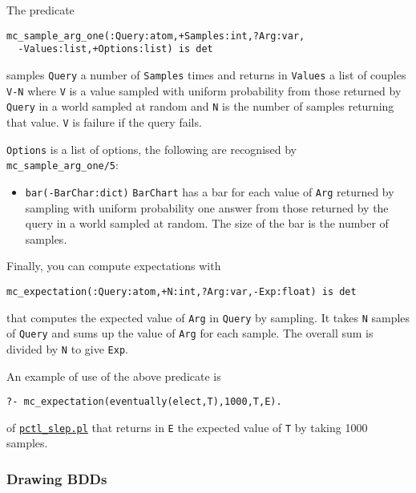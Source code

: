 The predicate
\begin{verbatim}
mc_sample_arg_one(:Query:atom,+Samples:int,?Arg:var,
  -Values:list,+Options:list) is det
\end{verbatim}
 samples \verb|Query| a number of \verb|Samples| times
and returns in \verb|Values| a list of couples \verb|V-N| where
\verb|V| is a value sampled with uniform probability from those returned
by \verb|Query| in a world sampled at random and \verb|N| is the number of samples
returning that value.
\verb|V| is failure if the query fails.

\verb|Options| is a list of options, the following are recognised by \verb|mc_sample_arg_one/5|:
\begin{itemize}
\item \verb|bar(-BarChar:dict)|
\verb|BarChart| has a bar for each value of \verb|Arg| returned by sampling with uniform
    probability one answer from those returned by the query in a world sampled
    at random.
    The size of the bar is the number of samples.
\end{itemize}


Finally, you can compute expectations with
\begin{verbatim}
mc_expectation(:Query:atom,+N:int,?Arg:var,-Exp:float) is det
\end{verbatim}
that computes the expected value of \verb|Arg| in \verb|Query| by
sampling.
It takes \verb|N| samples of \verb|Query| and sums up the value of \verb|Arg| for
each sample. The overall sum is divided by \verb|N| to give \verb|Exp|.

An example of use of the above predicate is
\begin{verbatim}
?- mc_expectation(eventually(elect,T),1000,T,E).
\end{verbatim}
of \href{http://cplint.eu/example/inference/pctl_slep.pl}{\texttt{pctl\_slep.pl}}
that returns in \verb|E| the expected value of \verb|T| by taking 1000 samples.

\subsubsection{Drawing BDDs}

